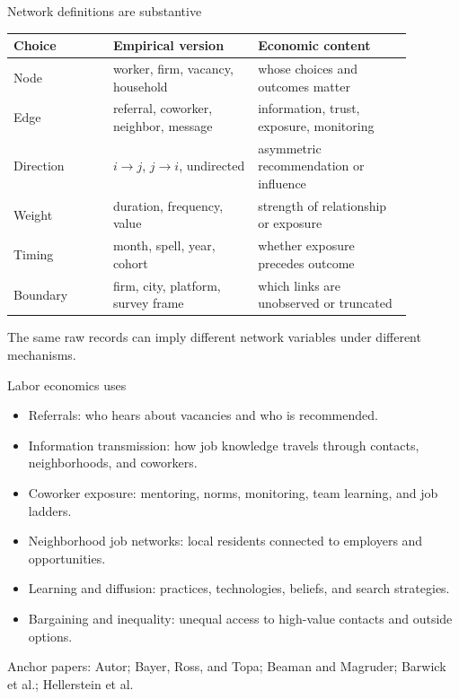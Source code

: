 \documentclass[aspectratio=169,11pt]{beamer}
\newcommand{\1}{\mathbf{1}}
\begin{document}
\begin{frame}{Network definitions are substantive}
\small
\begin{tabular}{p{0.22\linewidth} p{0.32\linewidth} p{0.34\linewidth}}
\toprule
Choice & Empirical version & Economic content \\
\midrule
Node & worker, firm, vacancy, household & whose choices and outcomes matter \\
Edge & referral, coworker, neighbor, message & information, trust, exposure, monitoring \\
Direction & \(i \to j\), \(j \to i\), undirected & asymmetric recommendation or influence \\
Weight & duration, frequency, value & strength of relationship or exposure \\
Timing & month, spell, year, cohort & whether exposure precedes outcome \\
Boundary & firm, city, platform, survey frame & which links are unobserved or truncated \\
\bottomrule
\end{tabular}

\medskip
The same raw records can imply different network variables under different mechanisms.
\end{frame}

\begin{frame}{Labor economics uses}
\begin{itemize}
    \item Referrals: who hears about vacancies and who is recommended.
    \item Information transmission: how job knowledge travels through contacts, neighborhoods, and coworkers.
    \item Coworker exposure: mentoring, norms, monitoring, team learning, and job ladders.
    \item Neighborhood job networks: local residents connected to employers and opportunities.
    \item Learning and diffusion: practices, technologies, beliefs, and search strategies.
    \item Bargaining and inequality: unequal access to high-value contacts and outside options.
\end{itemize}

\medskip
Anchor papers: Autor; Bayer, Ross, and Topa; Beaman and Magruder; Barwick et al.; Hellerstein et al.
\end{frame}
\end{document}

